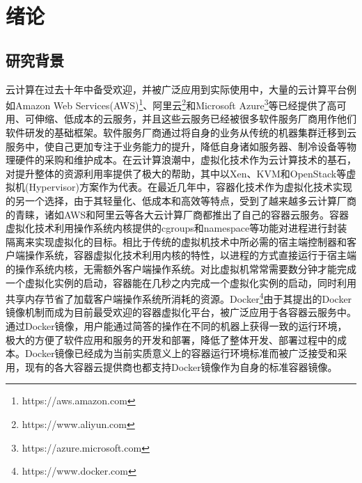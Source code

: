 
\chapter{绪论}
\label{chap:intro}

\section{研究背景}
云计算在过去十年中备受欢迎，并被广泛应用到实际使用中，大量的云计算平台例如Amazon Web Services(AWS)\footnote{https://aws.amazon.com}、阿里云\footnote{https://www.aliyun.com}和Microsoft Azure\footnote{https://azure.microsoft.com}等已经提供了高可用、可伸缩、低成本的云服务，并且这些云服务已经被很多软件服务厂商用作他们软件研发的基础框架。软件服务厂商通过将自身的业务从传统的机器集群迁移到云服务中，使自己更加专注于业务能力的提升，降低自身诸如服务器、制冷设备等物理硬件的采购和维护成本。在云计算浪潮中，虚拟化技术作为云计算技术的基石\cite{zhang2010cloud}，对提升整体的资源利用率提供了极大的帮助，其中以Xen\cite{barham2003xen}、KVM\cite{kivity2007kvm}和OpenStack\cite{sefraoui2012openstack}等虚拟机(Hypervisor)\cite{buyya2010cloud}方案作为代表。在最近几年中，容器化技术作为虚拟化技术实现的另一个选择，由于其轻量化、低成本和高效等特点\cite{soltesz2007container}，受到了越来越多云计算厂商的青睐，诸如AWS和阿里云等各大云计算厂商都推出了自己的容器云服务。容器虚拟化技术利用操作系统内核提供的cgroups和namespace等功能对进程进行封装隔离来实现虚拟化的目标。相比于传统的虚拟机技术中所必需的宿主端控制器和客户端操作系统，容器虚拟化技术利用内核的特性，以进程的方式直接运行于宿主端的操作系统内核，无需额外客户端操作系统。对比虚拟机常常需要数分钟才能完成一个虚拟化实例的启动，容器能在几秒之内完成一个虚拟化实例的启动，同时利用共享内存节省了加载客户端操作系统所消耗的资源。Docker\footnote{https://www.docker.com}由于其提出的Docker镜像机制而成为目前最受欢迎的容器虚拟化平台\cite{merkel2014docker}，被广泛应用于各容器云服务中。通过Docker镜像，用户能通过简答的操作在不同的机器上获得一致的运行环境，极大的方便了软件应用和服务的开发和部署，降低了整体开发、部署过程中的成本。Docker镜像已经成为当前实质意义上的容器运行环境标准而被广泛接受和采用，现有的各大容器云提供商也都支持Docker镜像作为自身的标准容器镜像。

